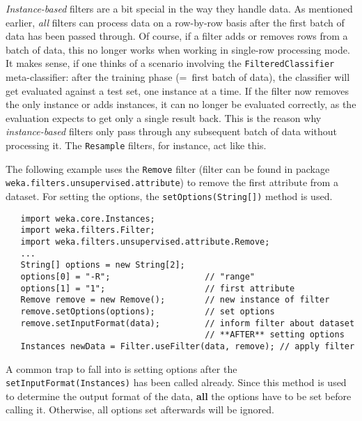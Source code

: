 \textit{Instance-based} filters are a bit special in the way they handle data.
As mentioned earlier, \textit{all} filters can process data on a row-by-row
basis after the first batch of data has been passed through. Of course, if a
filter adds or removes rows from a batch of data, this no longer works when
working in single-row processing mode. It makes sense, if one thinks of a
scenario involving the \texttt{FilteredClassifier} meta-classifier: after
the training phase (=\ first batch of data), the classifier will get
evaluated against a test set, one instance at a time. If the filter now
removes the only instance or adds instances, it can no longer be evaluated
correctly, as the evaluation expects to get only a single result back. This is
the reason why \textit{instance-based} filters only pass through any subsequent
batch of data without processing it. The \texttt{Resample} filters, for
instance, act like this.

\newpage

The following example uses the \texttt{Remove} filter (filter can be
found in package \texttt{weka.filters.unsupervised.attribute}) to remove the
first attribute from a dataset. For setting the options, the
\texttt{setOptions(String[])} method is used.
\begin{verbatim}
   import weka.core.Instances;
   import weka.filters.Filter;
   import weka.filters.unsupervised.attribute.Remove;
   ...
   String[] options = new String[2];
   options[0] = "-R";                   // "range"
   options[1] = "1";                    // first attribute
   Remove remove = new Remove();        // new instance of filter
   remove.setOptions(options);          // set options
   remove.setInputFormat(data);         // inform filter about dataset
                                        // **AFTER** setting options
   Instances newData = Filter.useFilter(data, remove); // apply filter
\end{verbatim}
A common trap to fall into is setting options after the
\texttt{setInputFormat(Instances)} has been called already. Since this method
is used to determine the output format of the data, \textbf{all} the options
have to be set before calling it. Otherwise, all options set afterwards will be
ignored.


